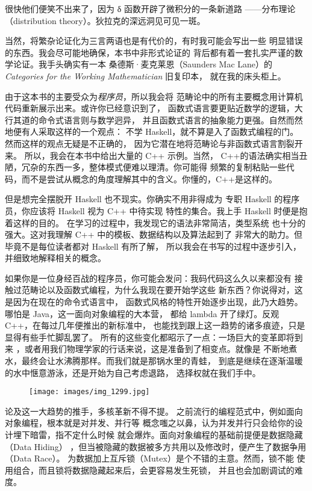 很快他们便笑不出来了，因为 δ 函数开辟了微积分的一条新道路
——分布理论（distribution theory）。狄拉克的深远洞见可见一斑。


当然，将繁杂论证化为三言两语也是有代价的，有时我可能会写出一些
明显错误的东西。我会尽可能地确保，本书中非形式论证的
背后都有着一套扎实严谨的数学论证。我手头确实有一本
桑德斯·麦克莱恩（Saunders Mac Lane）的\emph{Categories for the Working Mathematician} 旧复印本，
就在我的床头柜上。

由于这本书的主要受众为\emph{程序员}，所以我会将
范畴论中的所有主要概念用计算机代码重新展示出来。或许你已经意识到了，
函数式语言要更贴近数学的逻辑，大行其道的命令式语言则与数学迥异，
并且函数式语言的抽象能力更强。自然而然地便有人采取这样的一个观点：
不学 Haskell，就不算是入了函数式编程的门。
然而这样的观点无疑是不正确的，
因为它潜在地将范畴论与非函数式语言割裂开来。
所以，我会在本书中给出大量的 C++ 示例。当然，
C++的语法确实相当丑陋，冗杂的东西一多，整体模式便难以理清。你可能得
频繁的复制粘贴一些代码，而不是尝试从概念的角度理解其中的含义。你懂的，C++是这样的。



但是想完全摆脱开 Haskell 也不现实。你确实不用非得成为
专职 Haskell 的程序员，你应该将 Haskell 视为 C++ 中待实现
特性的集合。我上手 Haskell 时便是抱着这样的目的。
在学习的过程中，我发现它的语法非常简洁，类型系统
也十分的强大。这对我理解 C++ 中的模板、数据结构以及算法起到了
非常大的助力。但毕竟不是每位读者都对 Haskell 有所了解，
所以我会在书写的过程中逐步引入，并细致地解释相关的概念。


如果你是一位身经百战的程序员，你可能会发问：我码代码这么久以来都没有
接触过范畴论以及函数式编程，为什么我现在要开始学这些
新东西？你说得对，这是因为在现在的命令式语言中，
函数式风格的特性开始逐步出现，此乃大趋势。
哪怕是 Java，这一面向对象编程的大本营，
都给 lambda 开了绿灯。反观 C++，在每过几年便推出的新标准中，
也能找到跟上这一趋势的诸多痕迹，只是显得有些手忙脚乱罢了。
所有的这些变化都昭示了一点：一场巨大的变革即将到来
，或者用我们物理学家的行话来说，这是准备到了相变点。就像是
不断地煮水，最终会让水沸腾那样。而我们就是那锅水里的青蛙，
到底是继续在逐渐温暖的水中惬意游泳，还是开始为自己考虑退路，
选择权就在我们手中。

\begin{figure}[H]
  \centering
  \texttt{[image: images/img\_1299.jpg]}
\end{figure}

\noindent
论及这一大趋势的推手，多核革新不得不提。
之前流行的编程范式中，例如面向对象编程，根本就是对并发、并行等
概念嗤之以鼻，认为并发并行只会给你的设计埋下暗雷，指不定什么时候
就会爆炸。面向对象编程的基础前提便是数据隐藏（Data Hiding）
，但当被隐藏的数据被多方共用以及修改时，便产生了数据争用（Data Race）。
为数据加上互斥锁（Mutex）是个不错的主意。然而，锁不能
使用组合，而且锁将数据隐藏起来后，会更容易发生死锁，
并且也会加剧调试的难度。


